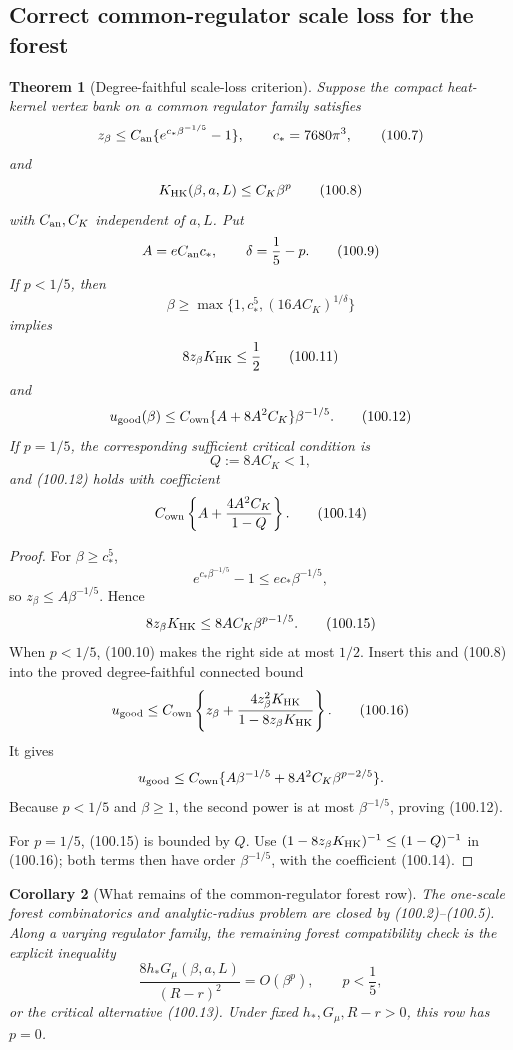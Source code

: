 \documentclass[11pt,oneside]{article}
\newtheorem{theorem}{Theorem}[section]
\newtheorem{corollary}[theorem]{Corollary}
\theoremstyle{definition}
\theoremstyle{remark}
\begin{document}
\subsection{Correct common-regulator scale loss for the forest}

\begin{theorem}[Degree-faithful scale-loss criterion]
\label{thm:newv100-degree-scale}
Suppose the compact heat-kernel vertex bank on a common regulator
family satisfies
\[
 z_\beta\le C_{\rm an}
 \{e^{c_*\beta^{-1/5}}-1\},\qquad c_*=7680\pi^3,      \tag{100.7}
\]
and
\[
 K_{\rm HK}(\beta,a,L)\le C_K\beta^p                 \tag{100.8}
\]
with \(C_{\rm an},C_K\) independent of \(a,L\).  Put
\[
 A=eC_{\rm an}c_*,\qquad \delta=\frac15-p.            \tag{100.9}
\]
If \(p<1/5\), then
\[
 \beta\ge
 \max\{1,c_*^5,(16AC_K)^{1/\delta}\}                 \tag{100.10}
\]
implies
\[
 8z_\beta K_{\rm HK}\le\frac12                       \tag{100.11}
\]
and
\[
 u_{\rm good}(\beta)
 \le C_{\rm own}
 \{A+8A^2C_K\}\beta^{-1/5}.                           \tag{100.12}
\]
If \(p=1/5\), the corresponding sufficient critical condition is
\[
 Q:=8AC_K<1,                                          \tag{100.13}
\]
and (100.12) holds with coefficient
\[
 C_{\rm own}\left\{
 A+\frac{4A^2C_K}{1-Q}\right\}.                       \tag{100.14}
\]
\end{theorem}

\begin{proof}
For \(\beta\ge c_*^5\),
\[
 e^{c_*\beta^{-1/5}}-1
 \le ec_*\beta^{-1/5},
\]
so \(z_\beta\le A\beta^{-1/5}\).  Hence
\[
 8z_\beta K_{\rm HK}
 \le8AC_K\beta^{p-1/5}.                              \tag{100.15}
\]
When \(p<1/5\), (100.10) makes the right side at most
\(1/2\).  Insert this and (100.8) into the proved
degree-faithful connected bound
\[
 u_{\rm good}\le C_{\rm own}
 \left\{z_\beta+
 \frac{4z_\beta^2K_{\rm HK}}
      {1-8z_\beta K_{\rm HK}}\right\}.                \tag{100.16}
\]
It gives
\[
 u_{\rm good}\le C_{\rm own}
 \{A\beta^{-1/5}
   +8A^2C_K\beta^{p-2/5}\}.
\]
Because \(p<1/5\) and \(\beta\ge1\), the second power is at most
\(\beta^{-1/5}\), proving (100.12).

For \(p=1/5\), (100.15) is bounded by \(Q\).  Use
\((1-8z_\beta K_{\rm HK})^{-1}\le(1-Q)^{-1}\) in
(100.16); both terms then have order \(\beta^{-1/5}\), with the
coefficient (100.14).
\end{proof}

\begin{corollary}[What remains of the common-regulator forest row]
\label{cor:newv100-forest-row}
The one-scale forest combinatorics and analytic-radius problem are
closed by (100.2)--(100.5).  Along a varying regulator family, the
remaining forest compatibility check is the explicit inequality
\[
 \frac{8h_*G_\mu(\beta,a,L)}{(R-r)^2}
 =O(\beta^p),\qquad p<\frac15,                       \tag{100.17}
\]
or the critical alternative (100.13).  Under fixed
\(h_*,G_\mu,R-r>0\), this row has \(p=0\).
\end{corollary}
\end{document}
